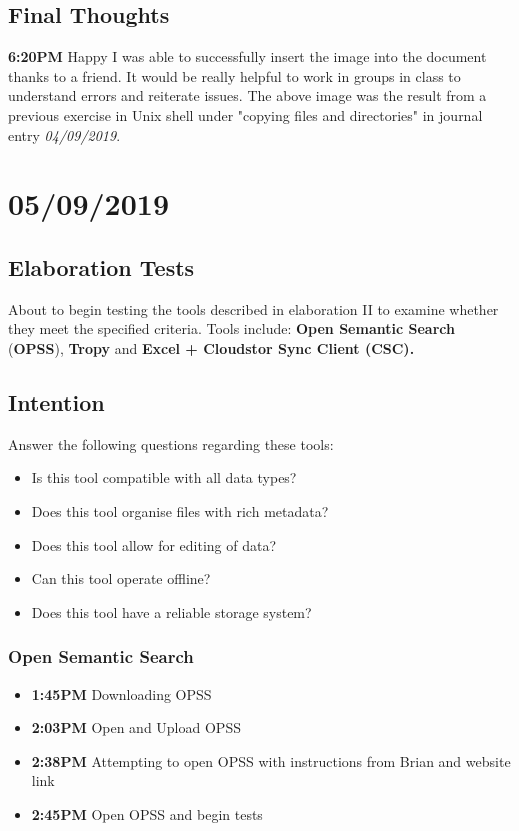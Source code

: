 \documentclass{article}
\begin{document}
\subsection{Final Thoughts}
\textbf{6:20PM} Happy I was able to successfully insert the image into the document thanks to a friend. It would be really helpful to work in groups in class to understand errors and reiterate issues. The above image was the result from a previous exercise in Unix shell under "copying files and directories" in journal entry \textit{04/09/2019}. 

\section{05/09/2019}
\subsection{Elaboration Tests}
About to begin testing the tools described in elaboration II to examine whether they meet the specified criteria. Tools include: \textbf{Open Semantic Search} (\textbf{OPSS}), \textbf{Tropy} and \textbf{Excel + Cloudstor Sync Client (CSC).}
\subsection{Intention}
Answer the following questions regarding these tools:
\begin{itemize}
\item Is this tool compatible with all data types?
\item Does this tool organise files with rich metadata?
\item Does this tool allow for editing of data?
\item Can this tool operate offline?
\item Does this tool have a reliable storage system?
\end{itemize}

\subsubsection{Open Semantic Search}
\begin{itemize}
\item \textbf{1:45PM} Downloading OPSS
\item \textbf{2:03PM} Open and Upload OPSS
\item \textbf{2:38PM} Attempting to open OPSS with instructions from Brian and website link
\item \textbf{2:45PM} Open OPSS and begin tests
\end{itemize}
\end{document}
